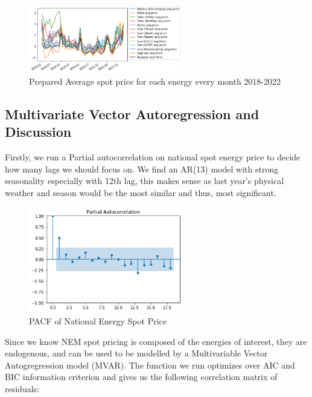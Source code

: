 \begin{figure}[H]
    \centering
    \includegraphics[width=0.6\textwidth]{Figures/NEM-Analysis/prep_data.png}
    \caption{Prepared Average spot price for each energy every month 2018-2022}
    \label{fig:NEM-avg-price}
\end{figure}

\subsection{Multivariate Vector Autoregression and Discussion}

Firstly, we run a Partial autocorrelation on national spot energy price to decide how many lags we should focus on. We find an AR(13) model with strong seasonality especially with 12th lag, this makes sense as last year's physical weather and season would be the most similar and thus, most significant.

\begin{figure}[H]
    \centering
    \includegraphics[width=0.6\textwidth]{Figures/NEM-Analysis/PACF-national.png}
    \caption{PACF of National Energy Spot Price}
    \label{fig:NEM-avg-price}
\end{figure}

Since we know NEM spot pricing is composed of the energies of interest, they are endogenous, and can be used to be modelled by a Multivariable Vector Autogregression model (MVAR). The function we run optimizes over AIC and BIC information criterion and gives us the following correlation matrix of residuals:

